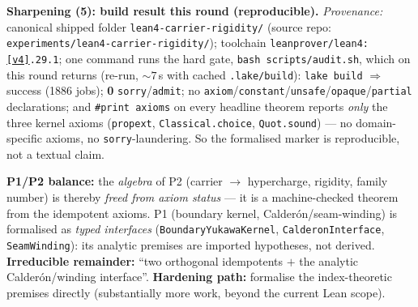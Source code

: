 \documentclass[11pt,a4paper]{article}
\theoremstyle{definition}
\begin{document}
\par\smallskip\noindent\textbf{Sharpening (5): build result this round (reproducible).}
\emph{Provenance:} canonical shipped folder \texttt{lean4-carrier-rigidity/} (source repo: \texttt{experiments/lean4-carrier-rigidity/}); toolchain
\texttt{leanprover/lean4:\vref{v4}.29.1}; one command runs the hard gate, \texttt{bash scripts/audit.sh},
which on this round returns (re-run, $\sim7$\,s with cached \texttt{.lake/build}):
\texttt{lake build} $\Rightarrow$ success (1886 jobs); \textbf{0} \texttt{sorry}/\texttt{admit}; no
\texttt{axiom}/\texttt{constant}/\texttt{unsafe}/\texttt{opaque}/\texttt{partial} declarations; and
\texttt{\#print axioms} on every headline theorem reports \emph{only} the three kernel axioms
(\texttt{propext}, \texttt{Classical.choice}, \texttt{Quot.sound}) --- no domain-specific axioms, no
\texttt{sorry}-laundering. So the formalised marker is reproducible, not a textual claim.

\noindent\textbf{P1/P2 balance:} the \emph{algebra} of P2 (carrier $\to$ hypercharge, rigidity, family
number) is thereby \emph{freed from axiom status} --- it is a machine-checked theorem from the
idempotent axioms. P1 (boundary kernel, Calder\'on/seam-winding) is formalised as \emph{typed
interfaces} (\texttt{BoundaryYukawaKernel}, \texttt{CalderonInterface}, \texttt{SeamWinding}): its
analytic premises are imported hypotheses, not derived. \textbf{Irreducible remainder:} ``two orthogonal
idempotents $+$ the analytic Calder\'on/winding interface''. \textbf{Hardening path:} formalise the
index-theoretic premises directly (substantially more work, beyond the current Lean scope). \mO
\end{document}
